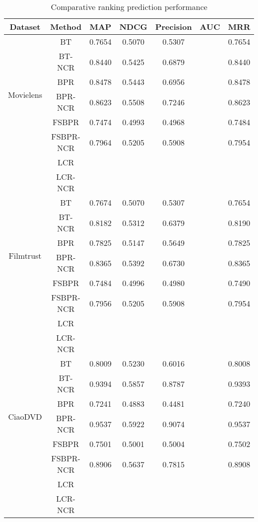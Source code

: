 \documentclass[letterpaper]{article} %
\begin{document}
\begin{table}[htp]
\tiny
\caption{Comparative ranking prediction performance}
\begin{center}
\begin{tabular}{|c|c|c|c|c|c|c|}
\hline
Dataset & Method & MAP & NDCG & Precision & AUC & MRR \\\hline
\multirow{6}{*}{Movielens} & BT &0.7654 &0.5070 &0.5307 & &0.7654 \\\cline{2-7}
 & BT-NCR &0.8440 &0.5425 &0.6879 & &0.8440 \\\cline{2-7}
 & BPR &0.8478 &0.5443 &0.6956 & &0.8478 \\\cline{2-7}
 & BPR-NCR &0.8623 &0.5508 &0.7246 & &0.8623 \\\cline{2-7}
 & FSBPR &0.7474 &0.4993 &0.4968 & &0.7484 \\\cline{2-7}
  & FSBPR-NCR &0.7964 &0.5205 &0.5908 & &0.7954 \\\cline{2-7}
   & LCR & & & & & \\\cline{2-7}
 & LCR-NCR & & & & & \\\hline
\multirow{6}{*}{Filmtrust} & BT &0.7674 &0.5070 &0.5307 & &0.7654 \\\cline{2-7}
 & BT-NCR &0.8182 &0.5312 &0.6379 & &0.8190 \\\cline{2-7}
 & BPR &0.7825 &0.5147 &0.5649 & &0.7825  \\\cline{2-7}
 & BPR-NCR &0.8365 &0.5392 &0.6730 & &0.8365 \\\cline{2-7}
 & FSBPR &0.7484 &0.4996 &0.4980 & &0.7490 \\\cline{2-7}
  & FSBPR-NCR &0.7956 &0.5205 &0.5908 & &0.7954 \\\cline{2-7}
   & LCR & & & & & \\\cline{2-7}
 & LCR-NCR & & & & & \\\hline
\multirow{6}{*}{CiaoDVD} & BT &0.8009 &0.5230 &0.6016 & &0.8008 \\\cline{2-7}
 & BT-NCR &0.9394 &0.5857 &0.8787 & &0.9393 \\\cline{2-7}
 & BPR &0.7241 &0.4883 &0.4481 & &0.7240 \\\cline{2-7}
 & BPR-NCR &0.9537 &0.5922 &0.9074 & &0.9537 \\\cline{2-7}
 & FSBPR &0.7501 &0.5001 &0.5004 & &0.7502 \\\cline{2-7}
  & FSBPR-NCR &0.8906 &0.5637 &0.7815 & &0.8908 \\\cline{2-7}
   & LCR & & & & & \\\cline{2-7}
 & LCR-NCR & & & & & \\\hline
\end{tabular}
\end{center}
\label{tab:rankingresult}
\end{table}%
\end{document}
